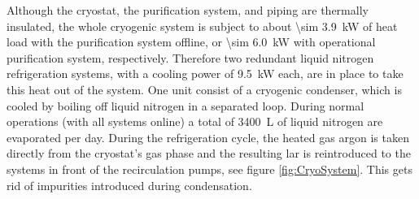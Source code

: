 Although the cryostat, the purification system, and piping are thermally insulated, the whole cryogenic system is subject to about \SI{\sim 3.9}{\kilo\watt} of heat load with the purification system offline, or \SI{\sim 6.0}{\kilo\watt} with operational purification system, respectively. Therefore two redundant liquid nitrogen refrigeration systems, with a cooling power of \SI{9.5}{\kilo\watt} each, are in place to take this heat out of the system. One unit consist of a cryogenic condenser, which is cooled by boiling off liquid nitrogen in a separated loop. During normal operations (with all systems online) a total of \SI{3400}{\liter} of liquid nitrogen are evaporated per day. During the refrigeration cycle, the heated gas argon is taken directly from the cryostat's gas phase and the resulting \gls{lar} is reintroduced to the systems in front of the recirculation pumps, see figure \ref{fig:CryoSystem}. This gets rid of impurities introduced during condensation.

